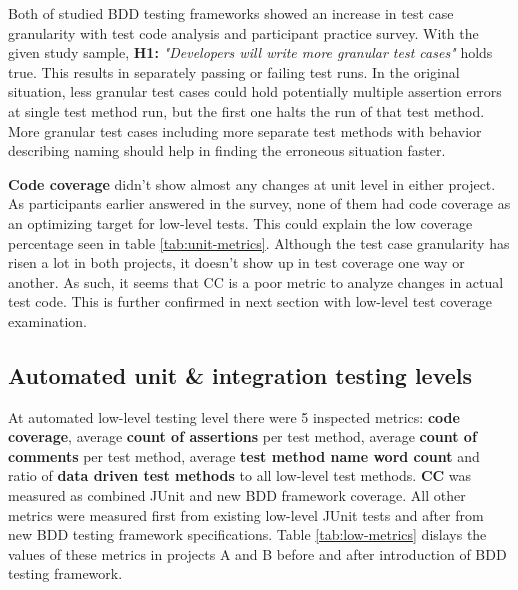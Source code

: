 Both of studied BDD testing frameworks showed an increase in test case granularity with test code analysis and participant practice
survey. With the given study sample, \textbf{H1:} \textit{"Developers will write more granular test cases"} holds true.
This results in separately passing or failing test runs. In the original situation, less granular test cases could hold potentially multiple
assertion errors at single test method run, but the first one halts the run of that test method. More granular test cases including more separate
test methods with behavior describing naming should help in finding the erroneous situation faster.

\textbf{Code coverage} didn't show almost any changes at unit level in either project. As participants earlier answered in the survey, none
of them had code coverage as an optimizing target for low-level tests. This could explain the low coverage percentage seen in
table \ref{tab:unit-metrics}. Although the test case granularity has risen a lot in both projects, it doesn't
show up in test coverage one way or another. As such, it seems that CC is a poor metric to analyze changes in actual test
code. This is further confirmed in next section with low-level test coverage examination.

\subsection{Automated unit \& integration testing levels}
\label{subsub:low-level-metrics}
At automated low-level testing level there were 5 inspected metrics: \textbf{code coverage}, average \textbf{count of assertions} per test method,
average \textbf{count of comments} per test method, average \textbf{test method name word count} and ratio of \textbf{data driven test methods} to
all low-level test methods. \textbf{CC} was measured as combined JUnit and new BDD framework coverage. All other metrics
were measured first from existing low-level JUnit tests and after from new BDD testing framework specifications.
Table \ref{tab:low-metrics} dislays the values of these metrics in projects A and B before and after introduction of BDD testing framework.


